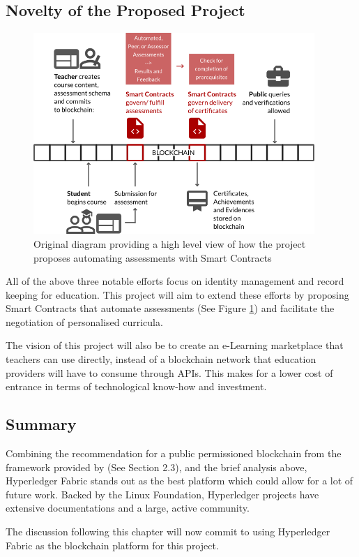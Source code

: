 \subsection{Novelty of the Proposed Project}

\begin{figure}[!ht]
	\centering
	\includegraphics[width=0.95\textwidth]{moocon}
	\caption[Assessment Smart Contracts Concept]
	{Original diagram providing a high level view of how the project proposes automating assessments
		with Smart Contracts}
	\label{fig:moocon_assess}
\end{figure}

All of the above three notable efforts focus on identity management and record keeping for education.
This project will aim to extend these efforts by proposing Smart Contracts that automate assessments
(See Figure \ref{fig:moocon_assess}) and facilitate the negotiation of personalised curricula.

The vision of this project will also be to create an e-Learning marketplace that teachers can use directly,
instead of a blockchain network that education providers will have to consume through APIs. This makes for a
lower cost of entrance in terms of technological know-how and investment.

\subsection*{Summary}

Combining the recommendation for a public permissioned blockchain from the framework provided
by \citet{wust2017you} (See Section 2.3), and the brief analysis above, Hyperledger Fabric
stands out as the best platform which could allow for a lot of future work. Backed by the
Linux Foundation, Hyperledger projects have extensive documentations and a large,
active community.

The discussion following this chapter will now commit to using Hyperledger
Fabric as the blockchain platform for this project.

